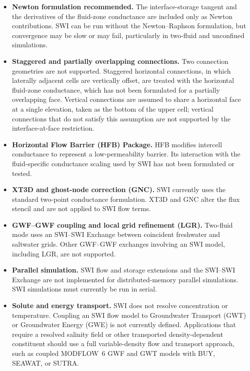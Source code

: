 \begin{itemize}

\item \textbf{Newton formulation recommended.} The interface-storage tangent and the derivatives of the fluid-zone conductance are included only as Newton contributions. SWI can be run without the \mf Newton--Raphson formulation, but convergence may be slow or may fail, particularly in two-fluid and unconfined simulations.

\item \textbf{Staggered and partially overlapping connections.} Two connection geometries are not supported. Staggered horizontal connections, in which laterally adjacent cells are vertically offset, are treated with the horizontal fluid-zone conductance, which has not been formulated for a partially overlapping face. Vertical connections are assumed to share a horizontal face at a single elevation, taken as the bottom of the upper cell; vertical connections that do not satisfy this assumption are not supported by the interface-at-face restriction.

\item \textbf{Horizontal Flow Barrier (HFB) Package.} HFB modifies intercell conductance to represent a low-permeability barrier. Its interaction with the fluid-specific conductance scaling used by SWI has not been formulated or tested.

\item \textbf{XT3D and ghost-node correction (GNC).} SWI currently uses the standard two-point conductance formulation. XT3D and GNC alter the flux stencil and are not applied to SWI flow terms.

\item \textbf{GWF--GWF coupling and local grid refinement (LGR).} Two-fluid mode uses an SWI--SWI Exchange between coincident freshwater and saltwater grids. Other GWF--GWF exchanges involving an SWI model, including LGR, are not supported.

\item \textbf{Parallel simulation.} SWI flow and storage extensions and the SWI--SWI Exchange are not implemented for distributed-memory parallel simulations. SWI simulations must currently be run in serial.

\item \textbf{Solute and energy transport.} SWI does not resolve concentration or temperature. Coupling an SWI flow model to Groundwater Transport (GWT) or Groundwater Energy (GWE) is not currently defined. Applications that require a resolved salinity field or other transported density-dependent constituent should use a full variable-density flow and transport approach, such as coupled MODFLOW~6 GWF and GWT models with BUY, SEAWAT, or SUTRA.


\end{itemize}
